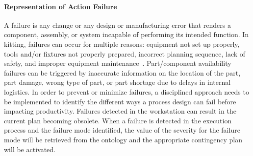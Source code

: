 \paragraph{Representation of Action Failure}\label{sss:failure}
 A failure is any change or any design or manufacturing error that renders a 
component, assembly, or system incapable of performing its intended function. 
In kitting, failures can occur for multiple reasons: equipment not set up properly, 
tools and/or fixtures not properly prepared, incorrect planning sequence, lack of safety, and improper equipment 
maintenance~\cite{Leger.1999,Kaiser.2007}. Part/component availability failures can be triggered by inaccurate information 
on the location of the part, part damage, wrong type of part, or part shortage due to delays 
in internal logistics. In order to prevent or minimize failures, a disciplined approach 
needs to be implemented to identify the different ways a process design can fail before 
impacting productivity. Failures detected in the workstation can result in the current 
plan becoming obsolete. When a failure is detected in the execution process and the failure 
mode identified, the value of the severity for the failure mode will be retrieved from the 
ontology and the appropriate contingency plan will be activated.
